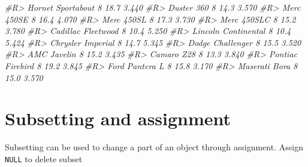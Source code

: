 \documentclass[]{book}
\newenvironment{Shaded}{}{}
\newcommand{\CommentTok}[1]{\textcolor[rgb]{0.38,0.63,0.69}{\textit{#1}}}
\newcommand{\DecValTok}[1]{\textcolor[rgb]{0.25,0.63,0.44}{#1}}
\newcommand{\KeywordTok}[1]{\textcolor[rgb]{0.00,0.44,0.13}{\textbf{#1}}}
\newcommand{\NormalTok}[1]{#1}
\newcommand{\OperatorTok}[1]{\textcolor[rgb]{0.40,0.40,0.40}{#1}}
\newcommand{\OtherTok}[1]{\textcolor[rgb]{0.00,0.44,0.13}{#1}}
\theoremstyle{definition}
\theoremstyle{definition}
\theoremstyle{definition}
\theoremstyle{remark}
\begin{document}
\begin{Shaded}
\begin{Highlighting}[]
\CommentTok{#R> Hornet Sportabout     8 18.7 3.440}
\CommentTok{#R> Duster 360            8 14.3 3.570}
\CommentTok{#R> Merc 450SE            8 16.4 4.070}
\CommentTok{#R> Merc 450SL            8 17.3 3.730}
\CommentTok{#R> Merc 450SLC           8 15.2 3.780}
\CommentTok{#R> Cadillac Fleetwood    8 10.4 5.250}
\CommentTok{#R> Lincoln Continental   8 10.4 5.424}
\CommentTok{#R> Chrysler Imperial     8 14.7 5.345}
\CommentTok{#R> Dodge Challenger      8 15.5 3.520}
\CommentTok{#R> AMC Javelin           8 15.2 3.435}
\CommentTok{#R> Camaro Z28            8 13.3 3.840}
\CommentTok{#R> Pontiac Firebird      8 19.2 3.845}
\CommentTok{#R> Ford Pantera L        8 15.8 3.170}
\CommentTok{#R> Maserati Bora         8 15.0 3.570}
\end{Highlighting}
\end{Shaded}

\hypertarget{subsetting-and-assignment}{%
\section{Subsetting and assignment}\label{subsetting-and-assignment}}

Subsetting can be used to change a part of an object through assignment.
Assign \texttt{NULL} to delete subset

\begin{Shaded}
\end{Shaded}
\end{document}
